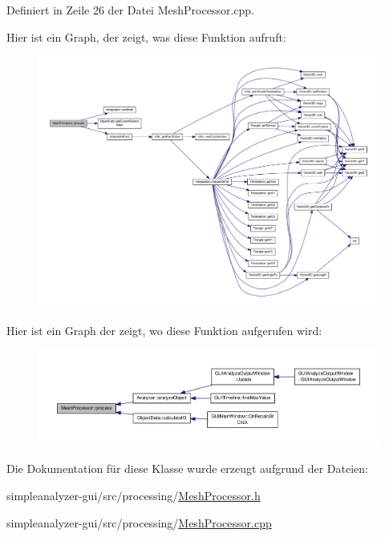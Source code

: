 Definiert in Zeile 26 der Datei Mesh\-Processor.\-cpp.



Hier ist ein Graph, der zeigt, was diese Funktion aufruft\-:
\nopagebreak
\begin{figure}[H]
\begin{center}
\leavevmode
\includegraphics[width=350pt]{classMeshProcessor_a060c3815db33f8e52ac620ed2239ccc9_cgraph}
\end{center}
\end{figure}




Hier ist ein Graph der zeigt, wo diese Funktion aufgerufen wird\-:\nopagebreak
\begin{figure}[H]
\begin{center}
\leavevmode
\includegraphics[width=350pt]{classMeshProcessor_a060c3815db33f8e52ac620ed2239ccc9_icgraph}
\end{center}
\end{figure}




Die Dokumentation für diese Klasse wurde erzeugt aufgrund der Dateien\-:\begin{DoxyCompactItemize}
\item 
simpleanalyzer-\/gui/src/processing/\hyperlink{MeshProcessor_8h}{Mesh\-Processor.\-h}\item 
simpleanalyzer-\/gui/src/processing/\hyperlink{MeshProcessor_8cpp}{Mesh\-Processor.\-cpp}\end{DoxyCompactItemize}
